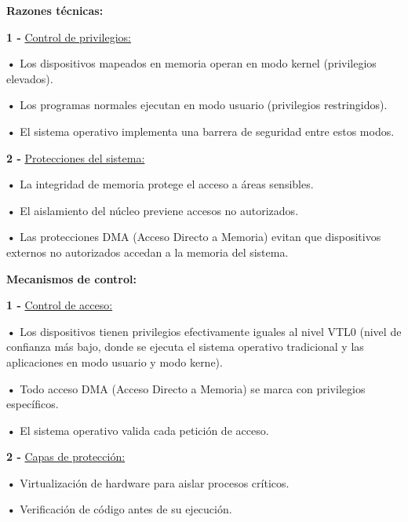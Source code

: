 \documentclass{article}
\begin{document}
\quad

\textbf{Razones técnicas: }

\quad

\textbf{1 -  } {\underline{Control de privilegios: }}

\quad

\textbf{    •} { Los dispositivos mapeados en memoria operan en modo kernel (privilegios elevados).}

\textbf{    •} { Los programas normales ejecutan en modo usuario (privilegios restringidos).}

\textbf{    •} { El sistema operativo implementa una barrera de seguridad entre estos modos.}

\quad

\textbf{2 -  } {\underline{Protecciones del sistema: }}

\quad

\textbf{    •} { La integridad de memoria protege el acceso a áreas sensibles.}

\textbf{    •} { El aislamiento del núcleo previene accesos no autorizados.}

\textbf{    •} { Las protecciones DMA (Acceso Directo a Memoria) evitan que dispositivos externos no autorizados accedan a la memoria del sistema.}



\quad

\textbf{Mecanismos de control: }

\quad

\textbf{1 -  } {\underline{Control de acceso: }}

\quad

\textbf{    •} { Los dispositivos tienen privilegios efectivamente iguales al nivel VTL0 (nivel de confianza más bajo, donde se ejecuta el sistema operativo tradicional y las aplicaciones en modo usuario y modo kerne).}

\textbf{    •} { Todo acceso DMA (Acceso Directo a Memoria) se marca con privilegios específicos.}

\textbf{    •} { El sistema operativo valida cada petición de acceso.}

\quad

\textbf{2 -  } {\underline{Capas de protección: }}

\quad

\textbf{    •} { Virtualización de hardware para aislar procesos críticos.}

\textbf{    •} { Verificación de código antes de su ejecución.}
\end{document}
